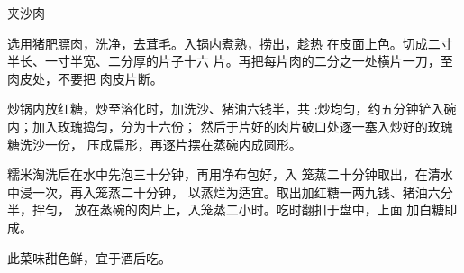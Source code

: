 \begin{recipe}{夹沙肉}

\ingredients


\cooking

\step 选用猪肥膘肉，洗净，去茸毛。入锅内煮熟，捞出，趁热 在皮面上色。切成二寸半长、一寸半宽、二分厚的片子十六 片。再把每片肉的二分之一处横片一刀，至肉皮处，不要把 肉皮片断。

\step 炒锅内放红糖，炒至溶化时，加洗沙、猪油六钱半，共 :炒均匀，约五分钟铲入碗内；加入玫瑰捣匀，分为十六份； 然后于片好的肉片破口处逐一塞入炒好的玫瑰糖洗沙一份， 压成扁形，再逐片摆在蒸碗内成圆形。

\step 糯米淘洗后在水中先泡三十分钟，再用净布包好，入 笼蒸二十分钟取出，在清水中浸一次，再入笼蒸二十分钟， 以蒸烂为适宜。取出加红糖一两九钱、猪油六分半，拌匀， 放在蒸碗的肉片上，入笼蒸二小时。吃时翻扣于盘中，上面 加白糖即成。

\notes

此菜味甜色鲜，宜于酒后吃。

\end{recipe}


